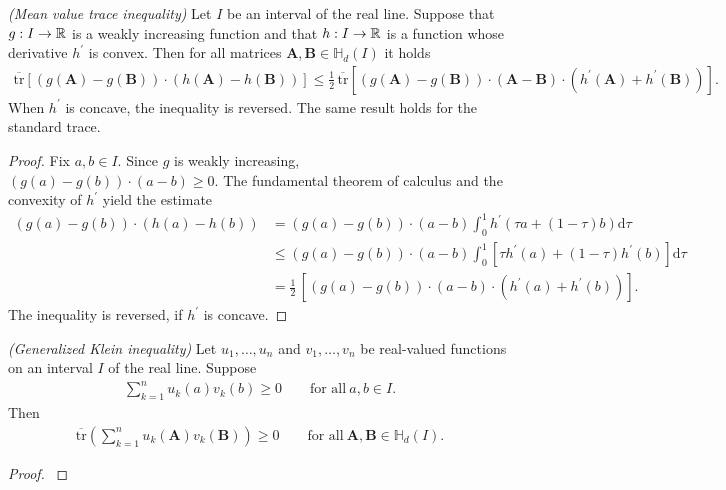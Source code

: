 \begin{lemma}
  \emph{(Mean value trace inequality)}
  Let 
  $I$
  be an interval of the real line. Suppose that
  $
    g:
    I \to \mathbb{R}
  $
  is a weakly increasing function and that 
  $
    h:
    I \to \mathbb{R}
  $
  is a function whose derivative $h^{'}$ is convex.
  Then for all matrices 
  $
    \mathbf{A}
    ,
    \mathbf{B}
    \in 
    \mathbb{H}_d(I)
  $
  it holds
  \begin{gather}
    \overline{\mathrm{tr}}
    [
    (
      g(\mathbf{A}) - g(\mathbf{B})
    )
    \cdot
    (
      h(\mathbf{A}) - h(\mathbf{B})
    )
    ]
    \le
    \frac{1}{2}
    \,
    \overline{\mathrm{tr}}
    [
    (
      g(\mathbf{A}) - g(\mathbf{B})
    )
    \cdot
    (
    \mathbf{A}
    -
    \mathbf{B}
    )
    \cdot
    (
    h^{'}(\mathbf{A}) + h^{'}(\mathbf{B})
    )
    ]
    .
  \end{gather}
  When $h^{'}$ is concave, the inequality is reversed. The same result holds for the standard trace.
\end{lemma}
\begin{proof}
  \emph{\cite[Lemma~3.4]{Mackey2014}}
  Fix 
  $
    a,b
    \in
    I
.
  $
  Since 
  $g$
  is
  weakly increasing,
  $
  (
    g(a) - g(b)
  )
  \cdot
  (a-b)
  \ge 0.
  $
  The 
  fundamental theorem of calculus and the convexity of 
  $h^{'}$
  yield the estimate
  \begin{align}
  (
    g(a) - g(b)
  )
  \cdot
  (
    h(a) - h(b)
  )
  &=
  (
    g(a) - g(b)
  )
  \cdot
  (a-b)
  \int_0^1
  h^{'}
  (
    \tau a + (1-\tau) b
  )
  \mathrm{d}\tau
  \\
  &\le
  (
    g(a) - g(b)
  )
  \cdot
  (a-b)
  \int_0^1
  [
  \tau
  h^{'}
  (
     a 
  )
  +
  (1-\tau)
  h^{'}
  (
     b 
  )
  ]
  \mathrm{d}\tau
  \\
  &=
  \frac{1}{2}
  \,
  [
  (
    g(a) - g(b)
  )
  \cdot
  (a-b)
  \cdot  
  (
    h^{'}
    (a)
    +
    h^{'}
    (b)
  )
  ]
  .
  \end{align}
  The inequality is reversed, if $h^{'}$ is concave.
\end{proof}

\begin{proposition}
  \emph{(Generalized Klein inequality)}
  Let 
  $
    u_1, \ldots, u_n
  $
  and
  $
    v_1, \ldots, v_n
  $
  be real-valued functions on an interval $I$
  of the real line.
  Suppose
  \begin{gather}
    \sum_{k=1}^{n}
    u_k(a)
    v_k(b)
    \ge
    0
    \qquad
    \text{for all}
    \ 
    a,b \in I
    .
  \end{gather}
  Then
  \begin{gather}
    \overline{\mathrm{tr}}
    \left( 
    \sum_{k=1}^{n}
    u_k(\mathbf{A})
    v_k(\mathbf{B})
    \right)
    \ge 0
    \qquad
    \text{for all}
    \ 
    \mathbf{A}, \mathbf{B} \in \mathbb{H}_d(I)
    .
  \end{gather}
\end{proposition}
\begin{proof}
  \emph{\cite[Proposition~3]{Petz1994}}
\end{proof}





